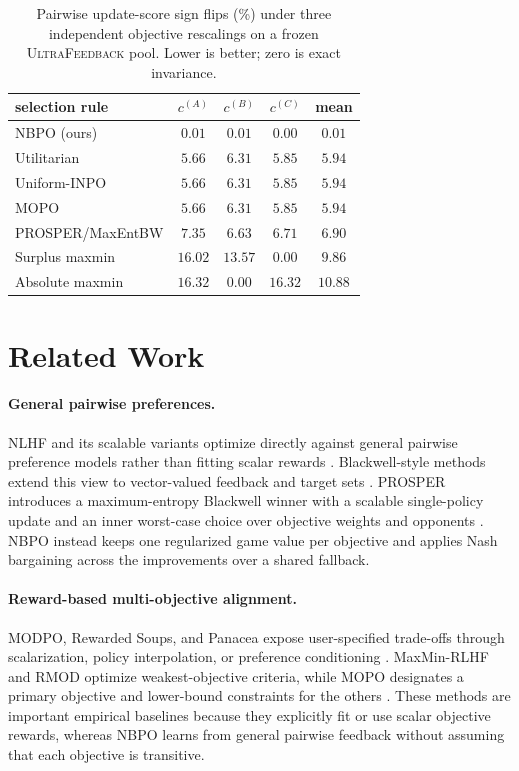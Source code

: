 \documentclass{article}
\theoremstyle{remark}
\theoremstyle{plain}
\newcommand{\NBPO}{\textsc{NBPO}}
\begin{document}
\begin{table}[t]
\centering\footnotesize
\setlength{\tabcolsep}{4.0pt}
\caption{Pairwise update-score sign flips (\%) under three independent objective rescalings on a frozen \textsc{UltraFeedback} pool. Lower is better; zero is exact invariance.}
\label{tab:uf-scale-covariance}
\begin{tabular}{lcccc}
\toprule
selection rule & $c^{(A)}$ & $c^{(B)}$ & $c^{(C)}$ & mean\\
\midrule
\NBPO{} (ours) & $\mathbf{0.01}$ & $\mathbf{0.01}$ & $\mathbf{0.00}$ & $\mathbf{0.01}$\\
Utilitarian & $5.66$ & $6.31$ & $5.85$ & $5.94$\\
Uniform-INPO & $5.66$ & $6.31$ & $5.85$ & $5.94$\\
MOPO & $5.66$ & $6.31$ & $5.85$ & $5.94$\\
PROSPER/MaxEntBW & $7.35$ & $6.63$ & $6.71$ & $6.90$\\
Surplus maxmin & $16.02$ & $13.57$ & $0.00$ & $9.86$\\
Absolute maxmin & $16.32$ & $0.00$ & $16.32$ & $10.88$\\
\bottomrule
\end{tabular}
\end{table}

\section{Related Work}
\label{sec:related}
\paragraph{General pairwise preferences.}
NLHF and its scalable variants optimize directly against general pairwise preference models rather than fitting scalar rewards \citep{munos2024nash,wu2025sppo,zhang2025iterative,calandriello2024online,rosset2024direct,zhou2025egpo}. Blackwell-style methods extend this view to vector-valued feedback and target sets \citep{blackwell1956analog,bhatia2020multicriteria}. PROSPER introduces a maximum-entropy Blackwell winner with a scalable single-policy update and an inner worst-case choice over objective weights and opponents \citep{zhang2026prosper}. \NBPO{} instead keeps one regularized game value per objective and applies Nash bargaining across the improvements over a shared fallback.

\paragraph{Reward-based multi-objective alignment.}
MODPO, Rewarded Soups, and Panacea expose user-specified trade-offs through scalarization, policy interpolation, or preference conditioning \citep{zhou2024beyond,rame2023rewarded,zhong2024panacea}. MaxMin-RLHF and RMOD optimize weakest-objective criteria, while MOPO designates a primary objective and lower-bound constraints for the others \citep{chakraborty2024maxmin,son2026rmod,agnihotri2026mopo}. These methods are important empirical baselines because they explicitly fit or use scalar objective rewards, whereas \NBPO{} learns from general pairwise feedback without assuming that each objective is transitive.
\end{document}
